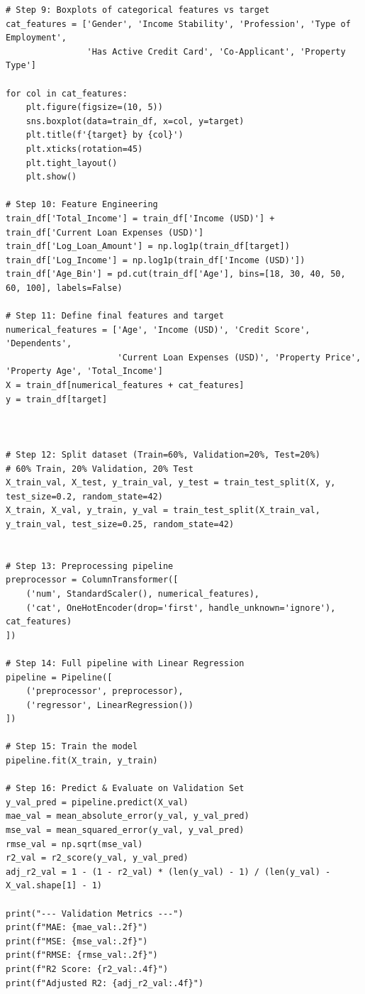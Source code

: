 \documentclass[12pt]{article}
\begin{document}
\begin{lstlisting}
# Step 9: Boxplots of categorical features vs target
cat_features = ['Gender', 'Income Stability', 'Profession', 'Type of Employment',
                'Has Active Credit Card', 'Co-Applicant', 'Property Type']

for col in cat_features:
    plt.figure(figsize=(10, 5))
    sns.boxplot(data=train_df, x=col, y=target)
    plt.title(f'{target} by {col}')
    plt.xticks(rotation=45)
    plt.tight_layout()
    plt.show()

# Step 10: Feature Engineering
train_df['Total_Income'] = train_df['Income (USD)'] + train_df['Current Loan Expenses (USD)']
train_df['Log_Loan_Amount'] = np.log1p(train_df[target])
train_df['Log_Income'] = np.log1p(train_df['Income (USD)'])
train_df['Age_Bin'] = pd.cut(train_df['Age'], bins=[18, 30, 40, 50, 60, 100], labels=False)

# Step 11: Define final features and target
numerical_features = ['Age', 'Income (USD)', 'Credit Score', 'Dependents',
                      'Current Loan Expenses (USD)', 'Property Price', 'Property Age', 'Total_Income']
X = train_df[numerical_features + cat_features]
y = train_df[target]



# Step 12: Split dataset (Train=60%, Validation=20%, Test=20%)
# 60% Train, 20% Validation, 20% Test
X_train_val, X_test, y_train_val, y_test = train_test_split(X, y, test_size=0.2, random_state=42)
X_train, X_val, y_train, y_val = train_test_split(X_train_val, y_train_val, test_size=0.25, random_state=42)


# Step 13: Preprocessing pipeline
preprocessor = ColumnTransformer([
    ('num', StandardScaler(), numerical_features),
    ('cat', OneHotEncoder(drop='first', handle_unknown='ignore'), cat_features)
])

# Step 14: Full pipeline with Linear Regression
pipeline = Pipeline([
    ('preprocessor', preprocessor),
    ('regressor', LinearRegression())
])

# Step 15: Train the model
pipeline.fit(X_train, y_train)

# Step 16: Predict & Evaluate on Validation Set
y_val_pred = pipeline.predict(X_val)
mae_val = mean_absolute_error(y_val, y_val_pred)
mse_val = mean_squared_error(y_val, y_val_pred)
rmse_val = np.sqrt(mse_val)
r2_val = r2_score(y_val, y_val_pred)
adj_r2_val = 1 - (1 - r2_val) * (len(y_val) - 1) / (len(y_val) - X_val.shape[1] - 1)

print("--- Validation Metrics ---")
print(f"MAE: {mae_val:.2f}")
print(f"MSE: {mse_val:.2f}")
print(f"RMSE: {rmse_val:.2f}")
print(f"R2 Score: {r2_val:.4f}")
print(f"Adjusted R2: {adj_r2_val:.4f}")


\end{lstlisting}
\end{document}
